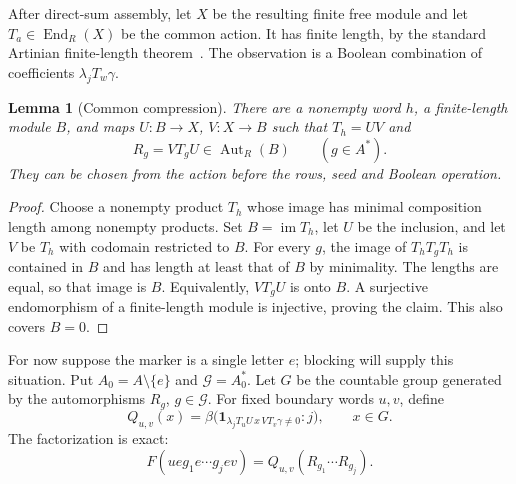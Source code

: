 \documentclass[11pt]{article}
\newtheorem{lemma}[theorem]{Lemma}
\theoremstyle{definition}
\theoremstyle{remark}
\newcommand{\one}{\mathbf 1}
\newcommand{\Aut}{\operatorname{Aut}}
\newcommand{\Gap}{\mathcal G}
\DeclareMathOperator{\End}{End}
\begin{document}
After direct-sum assembly, let $X$ be the resulting finite free module and let $T_a\in\End_R(X)$ be the common action. It has finite length, by the standard Artinian finite-length theorem~\cite[Tag 00JB]{Stacks}. The observation is a Boolean combination of coefficients $\lambda_jT_w\gamma$.

\begin{lemma}[Common compression]\label{lem:compression}
There are a nonempty word $h$, a finite-length module $B$, and maps
$U:B\to X$, $V:X\to B$ such that $T_h=UV$ and
\[
 R_g=VT_gU\in\Aut_R(B)\qquad(g\in A^*).
\]
They can be chosen from the action before the rows, seed and Boolean operation.
\end{lemma}
\begin{proof}
Choose a nonempty product $T_h$ whose image has minimal composition length among nonempty products. Set $B=\operatorname{im}T_h$, let $U$ be the inclusion, and let $V$ be $T_h$ with codomain restricted to $B$.
For every $g$, the image of $T_hT_gT_h$ is contained in $B$ and has length at least that of $B$ by minimality. The lengths are equal, so that image is $B$. Equivalently, $VT_gU$ is onto $B$. A surjective endomorphism of a finite-length module is injective, proving the claim. This also covers $B=0$.
\end{proof}

For now suppose the marker is a single letter $e$; blocking will supply this situation. Put $A_0=A\setminus\{e\}$ and $\Gap=A_0^*$. Let $G$ be the countable group generated by the automorphisms $R_g$, $g\in\Gap$. For fixed boundary words $u,v$, define
\begin{equation}\label{eq:Q}
 Q_{u,v}(x)=\beta\bigl(\one_{\lambda_jT_uU\,x\,VT_v\gamma\ne0}:j\bigr),
 \qquad x\in G.
\end{equation}
The factorization is exact:
\begin{equation}\label{eq:factor}
 F(u e g_1 e\cdots g_j e v)=Q_{u,v}(R_{g_1}\cdots R_{g_j}).
\end{equation}
\end{document}
